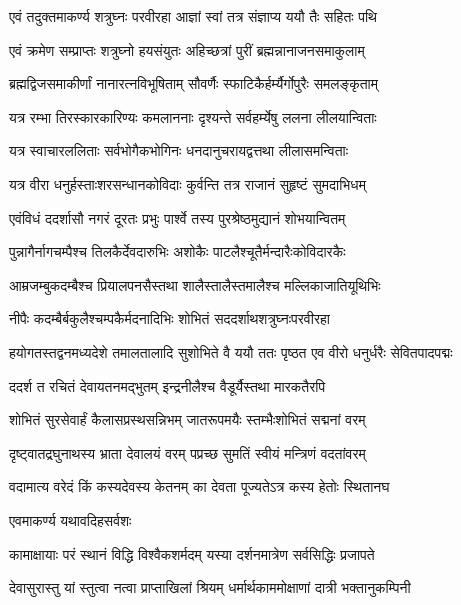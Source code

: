 \twolineshloka
{एवं तदुक्तमाकर्ण्य शत्रुघ्नः परवीरहा}
{आज्ञां स्वां तत्र संज्ञाप्य ययौ तैः सहितः पथि}%

\twolineshloka
{एवं क्रमेण सम्प्राप्तः शत्रुघ्नो हयसंयुतः}
{अहिच्छत्रां पुरीं ब्रह्मन्नानाजनसमाकुलाम्}%

\twolineshloka
{ब्रह्मद्विजसमाकीर्णां नानारत्नविभूषिताम्}
{सौवर्णैः स्फाटिकैर्हर्म्यैर्गोपुरैः समलङ्कृताम्}%

\twolineshloka
{यत्र रम्भा तिरस्कारकारिण्यः कमलाननाः}
{दृश्यन्ते सर्वहर्म्येषु ललना लीलयान्विताः}%

\twolineshloka
{यत्र स्वाचारललिताः सर्वभोगैकभोगिनः}
{धनदानुचरायद्वत्तथा लीलासमन्विताः}%

\twolineshloka
{यत्र वीरा धनुर्हस्ताःशरसन्धानकोविदाः}
{कुर्वन्ति तत्र राजानं सुहृष्टं सुमदाभिधम्}%

\twolineshloka
{एवंविधं ददर्शासौ नगरं दूरतः प्रभुः}
{पार्श्वे तस्य पुरश्रेष्ठमुद्यानं शोभयान्वितम्}%

\twolineshloka
{पुन्नागैर्नागचम्पैश्च तिलकैर्देवदारुभिः}
{अशोकैः पाटलैश्चूतैर्मन्दारैःकोविदारकैः}%

\twolineshloka
{आम्रजम्बुकदम्बैश्च प्रियालपनसैस्तथा}
{शालैस्तालैस्तमालैश्च मल्लिकाजातियूथिभिः}%

\twolineshloka
{नीपैः कदम्बैर्बकुलैश्चम्पकैर्मदनादिभिः}
{शोभितं सददर्शाथशत्रुघ्नःपरवीरहा}%

\fourlineindentedshloka
{हयोगतस्तद्वनमध्यदेशे}
{तमालतालादि सुशोभिते वै}
{ययौ ततः पृष्ठत एव वीरो}
{धनुर्धरैः सेवितपादपद्मः}%

\twolineshloka
{ददर्श त रचितं देवायतनमद्भुतम्}
{इन्द्रनीलैश्च वैडूर्यैस्तथा मारकतैरपि}%

\twolineshloka
{शोभितं सुरसेवार्हं कैलासप्रस्थसन्निभम्}
{जातरूपमयैः स्तम्भैःशोभितं सद्मनां वरम्}%

\twolineshloka
{दृष्ट्वातद्रघुनाथस्य भ्राता देवालयं वरम्}
{पप्रच्छ सुमतिं स्वीयं मन्त्रिणं वदतांवरम्}%


\twolineshloka
{वदामात्य वरेदं किं कस्यदेवस्य केतनम्}
{का देवता पूज्यतेऽत्र कस्य हेतोः स्थितानघ}%

\onelineshloka
{एवमाकर्ण्य यथावदिहसर्वशः}%

\twolineshloka
{कामाक्षायाः परं स्थानं विद्धि विश्वैकशर्मदम्}
{यस्या दर्शनमात्रेण सर्वसिद्धिः प्रजापते}%

\twolineshloka
{देवासुरास्तु यां स्तुत्वा नत्वा प्राप्ताखिलां श्रियम्}
{धर्मार्थकाममोक्षाणां दात्री भक्तानुकम्पिनी}%

